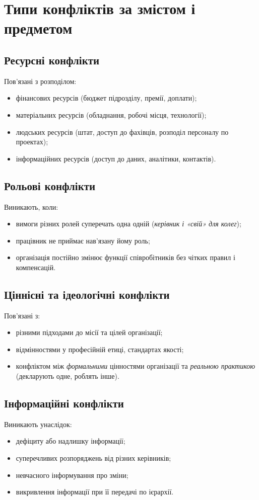 \documentclass[12pt,a4paper]{article}
\begin{document}
    \section*{Типи конфліктів за змістом і предметом}
    \subsection*{Ресурсні конфлікти}
    Пов’язані з розподілом:
    \begin{itemize}
        \item фінансових ресурсів (бюджет підрозділу, премії, доплати);
        \item матеріальних ресурсів (обладнання, робочі місця, технології);
        \item людських ресурсів (штат, доступ до фахівців, розподіл персоналу по проектах);
        \item інформаційних ресурсів (доступ до даних, аналітики, контактів).
    \end{itemize}

    \subsection*{Рольові конфлікти}
    Виникають, коли:
    \begin{itemize}
        \item вимоги різних ролей суперечать одна одній (\textit{керівник і «свій» для колег});
        \item працівник не приймає нав’язану йому роль;
        \item організація постійно змінює функції співробітників без чітких правил і компенсацій.
    \end{itemize}

    \subsection*{Ціннісні та ідеологічні конфлікти}
    Пов’язані з:
    \begin{itemize}
        \item різними підходами до місії та цілей організації;
        \item відмінностями у професійній етиці, стандартах якості;
        \item конфліктом між \textit{формальними} цінностями організації та \textit{реальною практикою} (декларують одне, роблять інше).
    \end{itemize}

    \subsection*{Інформаційні конфлікти}
    Виникають унаслідок:
    \begin{itemize}
        \item дефіциту або надлишку інформації;
        \item суперечливих розпоряджень від різних керівників;
        \item невчасного інформування про зміни;
        \item викривлення інформації при її передачі по ієрархії.
    \end{itemize}
\end{document}
